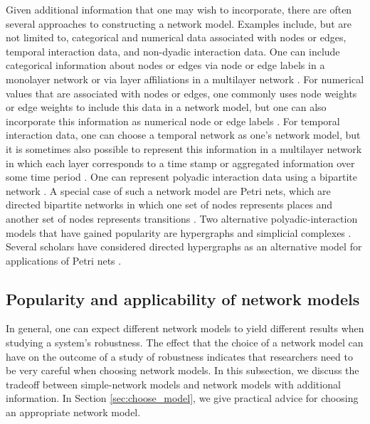 \documentclass{comnet-mod}
\begin{document}
Given additional information that one may wish to incorporate, there are often several approaches to constructing a network model. Examples include, but are not limited to, categorical and numerical data associated with nodes or edges, temporal interaction data, and non-dyadic interaction data. One can include categorical information about nodes or edges via node or edge labels in a monolayer network \cite{faust1994, Light2020} or via layer affiliations in a multilayer network \cite{Kivela2014}. For numerical values that are associated with nodes or edges, one commonly uses node weights or edge weights \cite{Antoniou2008} to include this data in a network model, but one can also incorporate this information as numerical node or edge labels \cite{Malhotra2021}. For temporal interaction data, one can choose a temporal network as one's network model, but it is sometimes also possible to represent this information in a multilayer network in which each layer corresponds to a time stamp or aggregated information over some time period \cite{Kivela2014}. One can represent polyadic interaction data using a bipartite network \cite{Asratian1998, Pavlopoulos2018}. A special case of such a network model are Petri nets, which are directed bipartite networks in which one set of nodes represents places and another set of nodes represents transitions \cite{Reisig2012}. Two alternative polyadic-interaction models that have gained popularity are hypergraphs and simplicial complexes \cite{Lambiotte2019, Battiston2020, Torres2020, Battiston2021, Bianconi2021, Battiston2022, Bick2023, Boccaletti2023}. Several scholars have considered directed hypergraphs as an alternative model for applications of Petri nets \cite{Ausiello1986, Restivo2001, Ritz2014}.

\subsection{Popularity and applicability of network models}

In general, one can expect different network models to yield different results when studying a system's robustness. The effect that the choice of a network model can have on the outcome of a study of robustness indicates that researchers need to be very careful when choosing network models. In this subsection, we discuss the tradeoff between simple-network models and network models with additional information. 
In Section \ref{sec:choose_model}, we give practical advice for choosing an appropriate network model.
\end{document}
